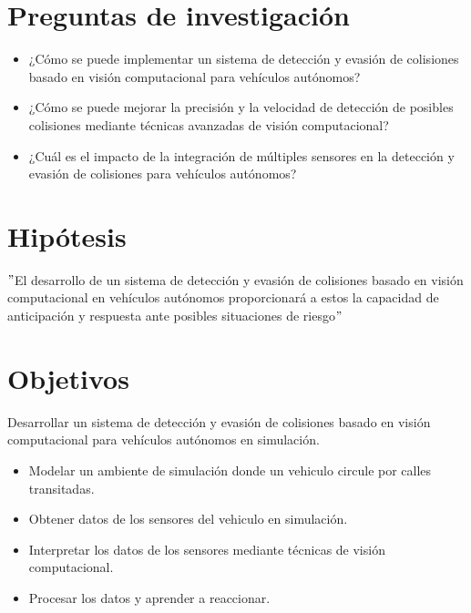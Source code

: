\documentclass[10pt,letterpaper,final]{article}
\begin{document}
    \section*{Preguntas de investigación}
    \begin{itemize}
        \item ¿Cómo se puede implementar un sistema de detección y evasión de colisiones basado en visión computacional para vehículos autónomos?
        \item ¿Cómo se puede mejorar la precisión y la velocidad de detección de posibles colisiones mediante técnicas avanzadas de visión computacional?
        \item ¿Cuál es el impacto de la integración de múltiples sensores en la detección y evasión de colisiones para vehículos autónomos?
    \end{itemize}
    
    \section*{Hipótesis}
    \("\)El desarrollo de un sistema de detección y evasión de colisiones basado en visión computacional en vehículos autónomos
    proporcionará a estos la capacidad de anticipación y respuesta ante posibles situaciones de riesgo\("\)
    
    \section*{Objetivos}
    \newline
    \noindent Desarrollar un sistema de detección y evasión de colisiones basado en visión computacional para vehículos autónomos en simulación.
    \newline
    \newline
    \begin{itemize}
        \item Modelar un ambiente de simulación donde un vehiculo circule por calles transitadas.
        \item Obtener datos de los sensores del vehiculo en simulación.
        \item Interpretar los datos de los sensores mediante técnicas de visión computacional.
        \item Procesar los datos y aprender a reaccionar.
    \end{itemize}
    \clearpage
\end{document}
